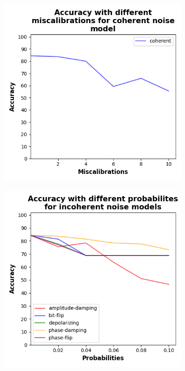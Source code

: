 \begin{figure}[!h]
  \centering

  \begin{subfigure}{0.45\textwidth}
      \includegraphics[width=\linewidth]{figures/evaluation_results/breast-cancer/pqc/figures/accuracy-coherent.png}
      \label{fig:bc1}
  \end{subfigure} \qquad
  \begin{subfigure}{0.45\textwidth}
      \includegraphics[width=\linewidth]{figures/evaluation_results/breast-cancer/pqc/figures/accuracy-incoherent.png}
      \label{fig:bc2}
  \end{subfigure}


\end{figure}
